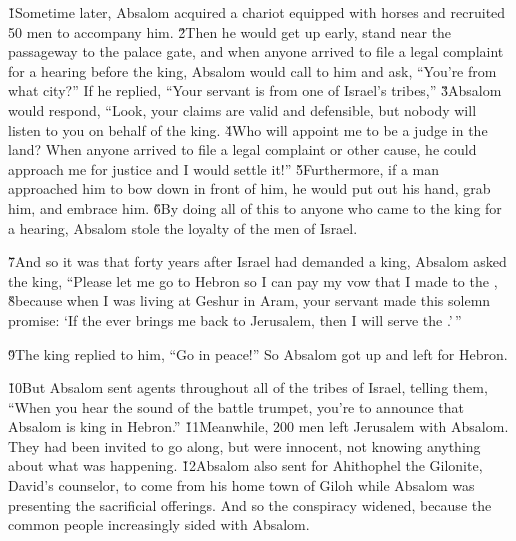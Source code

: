 \v{1}Sometime later, Absalom acquired a chariot equipped with horses and recruited 50 men to accompany him. \v{2}Then he would get up early, stand near the passageway to the palace gate, and when anyone arrived to file a legal complaint for a hearing before the king, Absalom would call to him and ask, ``You're from what city?'' If he replied, ``Your servant is from one of Israel's tribes,'' \v{3}Absalom would respond, ``Look, your claims are valid and defensible, but nobody will listen to you on behalf of the king. \v{4}Who will appoint me to be a judge in the land? When anyone arrived to file a legal complaint or other cause, he could approach me for justice and I would settle it!'' \v{5}Furthermore, if a man approached him to bow down in front of him, he would put out his hand, grab him, and embrace him. \v{6}By doing all of this to anyone who came to the king for a hearing, Absalom stole the loyalty of the men of Israel.

\v{7}And so it was that forty years after Israel had demanded a king, Absalom asked the king, ``Please let me go to Hebron so I can pay my vow that I made to the , \v{8}because when I was living at Geshur in Aram, your servant made this solemn promise: `If the  ever brings me back to Jerusalem, then I will serve the .'\,''

\v{9}The king replied to him, ``Go in peace!'' So Absalom got up and left for Hebron.

\v{10}But Absalom sent agents throughout all of the tribes of Israel, telling them, ``When you hear the sound of the battle trumpet, you're to announce that Absalom is king in Hebron.'' \v{11}Meanwhile, 200 men left Jerusalem with Absalom. They had been invited to go along, but were innocent, not knowing anything about what was happening. \v{12}Absalom also sent for Ahithophel the Gilonite, David's counselor, to come from his home town of Giloh while Absalom was presenting the sacrificial offerings. And so the conspiracy widened, because the common people increasingly sided with Absalom.

